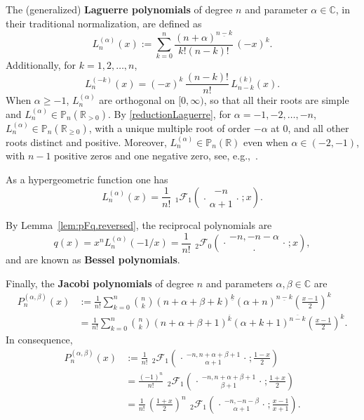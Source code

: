 \documentclass[reqno,11pt]{amsart}
\theoremstyle{remark}
\renewcommand{\P}{\mathbb{P}}
\newcommand{\R}{\mathbb{R}}
\newcommand{\C}{\mathbb{C}}
\newcommand{\raising}[2]{\left(#1\right)^{\overline{#2}}}
\newcommand{\falling}[2]{\left(#1\right)^{\underline{#2}}}
\newcommand*\pFq[5]{%
 {\ }_{#1}{\mathcal F}_{#2}{\left(\genfrac..{0pt}{}{#3}{#4};#5\right)}%
}
\begin{document}
The   (generalized) \textbf{Laguerre polynomials} of degree $n$ and parameter $\alpha\in \C$, in their traditional normalization, are defined as
\begin{equation}
    \label{laguerreP}
    L^{(\alpha)}_{n}(x):=\sum_{k=0}^{n}
\frac{ \falling{n+\alpha}{n-k}}{k!(n-k)!}\, (-x)^{k}.
\end{equation}
Additionally, for $k=1,2,\dots,n$,
\begin{equation} \label{reductionLaguerre}
    L_n^{(-k)}(x)=(-x)^k \, \frac{(n-k) !}{n !}\,  L_{n-k}^{(k)}(x).
\end{equation}
When $\alpha\geq -1$,   $ L^{(\alpha)}_{n} $ are orthogonal on $[0, \infty)$, so that all their roots are simple and $L^{(\alpha)}_{n} \in \P_n(\R_{>0})$. By \eqref{reductionLaguerre}, for $\alpha=-1,-2,\dots,-n$, $L^{(\alpha)}_{n}\in \P_n(\R_{\ge 0})$, with a unique multiple root of order $-\alpha$ at $ 0$, and all other roots distinct and positive. Moreover,  $L^{(\alpha)}_{n}\in \P_n(\R )$   even when  $\alpha\in(-2,-1)$, with   $n-1$ positive zeros and one negative zero, see, e.g.,~\cite[\S 6,73]{szego1975orthogonal}.  
 
As a hypergeometric function one has
\begin{equation} \label{HGFLaguerre}
L^{(\alpha)}_{n}(x)= 
\frac{1}{n!}\, 
\pFq{ 1}{1}{-n}{\alpha +1}{x}.
\end{equation}

By Lemma~\ref{lem:pFq.reversed}, the reciprocal polynomials are
\begin{equation}
    \label{reversedLaguerre}
    q(x)=x^n L^{(\alpha)}_{n}(-1/x)=\frac{1}{n!}\, \pFq{ 2}{0}{-n, -n-\alpha}{\cdot}{x},
\end{equation}
and are known as \textbf{Bessel polynomials}.

Finally, the \textbf{Jacobi polynomials} of degree $n$ and parameters $\alpha,\beta\in \C$ are
\begin{align*}
P^{(\alpha,\beta)}_{n}(x)&:=\frac{1}{n!}\sum_{k=0}^{n} \binom{n}{k} \falling{n+\alpha+\beta+k}{k} \falling{\alpha + n}{n-k} \left(\frac{x-1}{2}\right)^k \\
&=\frac{1}{n!}\sum_{k=0}^{n} \binom{n}{k} \raising{n+\alpha+\beta+1}{k} \raising{\alpha + k+1}{n-k} \left(\frac{x-1}{2}\right)^k.    
\end{align*}
In consequence,  
\begin{align} \label{JacobiPfla1}
P^{(\alpha,\beta)}_{n}(x)&:= \frac{1}{n!}\, \pFq{ 2}{1}{-n, n+ \alpha+ \beta+1}{\alpha +1}{\frac{1-x}{2}} 
\\ 
\label{JacobiPfla3}
& =\frac{(-1)^n}{n!}\, \pFq{ 2}{1}{-n, n+ \alpha+ \beta+1}{\beta +1}{\frac{1+x}{2}}
\\ 
\label{JacobiPfla2}
&=\frac{1}{n!}\, \left(\frac{1+x}{2}\right)^n \, \pFq{ 2}{1}{-n, -n-\beta}{\alpha + 1 }{\frac{x-1}{x+1}}.
\end{align}
\end{document}
